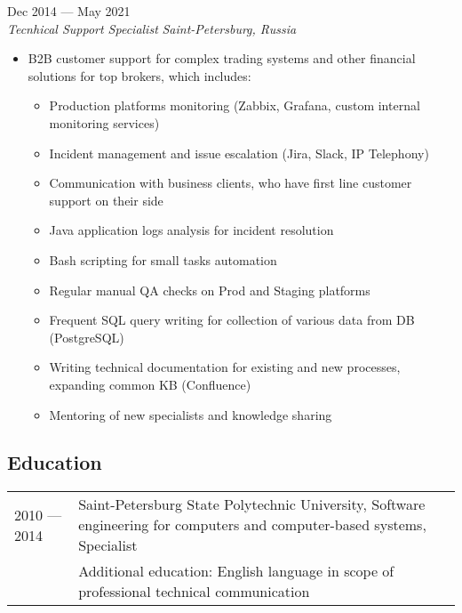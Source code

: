 \documentclass[10pt]{report}
\newenvironment{JobDescription}[5]{
    \vspace{ #5 }
    \flushleft
    {\bf #1 } \hfill { #2 }
    \\
    {\em #3 } \hfill {\em #4 }
    \begin{itemize}
} {
    \end{itemize}
}
\begin{document}
\begin{JobDescription}{}{Dec 2014 --- May 2021}{Tecnhical Support Specialist}{Saint-Petersburg, Russia}{0mm}
  \item B2B customer support for complex trading systems and other financial solutions for top brokers, which includes:
  \begin{itemize}
    \item Production platforms monitoring (Zabbix, Grafana, custom internal monitoring services)
    \item Incident management and issue escalation (Jira, Slack, IP Telephony)
    \item Communication with business clients, who have first line customer support on their side
    \item Java application logs analysis for incident resolution
    \item Bash scripting for small tasks automation
    \item Regular manual QA checks on Prod and Staging platforms
    \item Frequent SQL query writing for collection of various data from DB (PostgreSQL)
    \item Writing technical documentation for existing and new processes, expanding common KB (Confluence)
    \item Mentoring of new specialists and knowledge sharing
  \end{itemize}
\end{JobDescription}

\goodbreak

\subsection*{Education}
\begin{table}[H]
  \begin{tabular}{@{}p{}p{}}
    2010 --- 2014 & Saint-Petersburg State Polytechnic University, Software engineering for computers and computer-based systems, Specialist \\
                  & Additional education: English language in scope of professional technical communication
  \end{tabular}
\end{table}

\goodbreak
\end{document}
